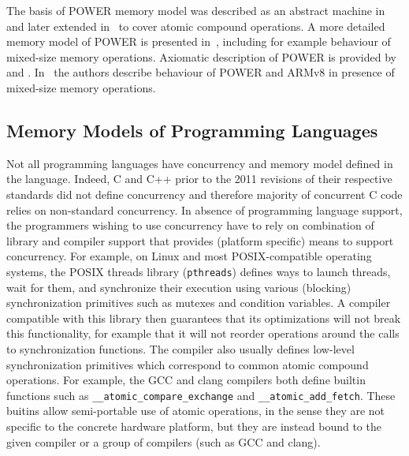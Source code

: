 The basis of POWER memory model was described as an abstract machine
in~ and later extended in~ to cover atomic
compound operations.
A more detailed memory model of POWER is presented in~,
including for example behaviour of mixed-size memory operations.
Axiomatic description of POWER is provided by~ and
.
In~ the authors describe behaviour of POWER and ARMv8 in
presence of mixed-size memory operations.

\subsection{Memory Models of Programming Languages\protect\mnotemark}%

Not all programming languages have concurrency and memory model defined in the
language.
Indeed, C and C++ prior to the 2011 revisions of their respective standards did
not define concurrency and therefore majority of concurrent C code relies on
non-standard concurrency.
In absence of programming language support, the programmers wishing to use
concurrency have to rely on combination of library and compiler support that
provides (platform specific) means to support concurrency.
For example, on Linux and most POSIX-compatible operating systems, the POSIX
threads library (\texttt{pthreads}) defines ways to launch threads, wait for
them, and synchronize their execution using various (blocking) synchronization
primitives such as mutexes and condition variables.
A compiler compatible with this library then guarantees that its optimizations
will not break this functionality, for example that it will not reorder
operations around the calls to synchronization functions.
The compiler also usually defines low-level synchronization primitives which correspond to common atomic compound operations.
For example, the GCC and clang compilers both define builtin functions such as \texttt{\_\_atomic\_compare\_exchange} and \texttt{\_\_atomic\_add\_fetch}.
These buitins allow semi-portable use of atomic operations, in the sense they are not specific to the concrete hardware platform, but they are instead bound to the given compiler or a group of compilers (such as GCC and clang).

